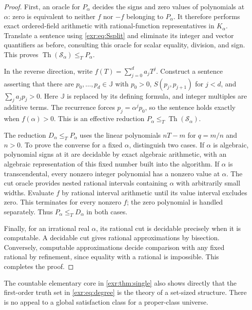 \documentclass[11pt,letterpaper]{article}
\numberwithin{equation}{section}
\theoremstyle{definition}
\theoremstyle{remark}
\newcommand{\J}{\mathbb J}
\newcommand{\Th}{\operatorname{Th}}
\begin{document}
\begin{proof}
First, an oracle for $P_\alpha$ decides the signs and zero values of polynomials
at $\alpha$: zero is equivalent to neither $f$ nor $-f$ belonging to $P_\alpha$.
It therefore performs exact ordered-field arithmetic with rational-function
representatives in $K_\alpha$. Translate a sentence using \eqref{exr:eq:Ssplit} and
eliminate its integer and vector quantifiers as before, consulting this oracle
for scalar equality, division, and sign. This proves
$\Th(\mathcal S_\alpha)\leq_T P_\alpha$.

In the reverse direction, write $f(T)=\sum_{j=0}^{d}a_jT^j$. Construct a sentence
asserting that there are $p_0,\ldots,p_d\in\J$ with $p_0>0$,
$S(p_j,p_{j+1})$ for $j<d$, and $\sum_j a_jp_j>0$. Here $\J$ is replaced by its
defining formula, and integer multiples are additive terms. The recurrence
forces $p_j=\alpha^jp_0$, so the sentence holds exactly when $f(\alpha)>0$.
This is an effective reduction $P_\alpha\leq_T\Th(\mathcal S_\alpha)$.

The reduction $D_\alpha\leq_T P_\alpha$ uses the linear polynomials $nT-m$ for
$q=m/n$ and $n>0$. To prove the converse for a fixed $\alpha$, distinguish two
cases. If $\alpha$ is algebraic, polynomial signs at it are decidable by exact
algebraic arithmetic, with an algebraic representation of this fixed number
built into the algorithm. If $\alpha$ is transcendental, every nonzero integer
polynomial has a nonzero value at $\alpha$. The cut oracle provides nested
rational intervals containing $\alpha$ with arbitrarily small widths. Evaluate
$f$ by rational interval arithmetic until its value interval excludes zero. This
terminates for every nonzero $f$; the zero polynomial is handled separately.
Thus $P_\alpha\leq_T D_\alpha$ in both cases.

Finally, for an irrational real $\alpha$, its rational cut is decidable precisely
when it is computable. A decidable cut gives rational approximations by bisection.
Conversely, computable approximations decide comparison with any fixed rational
by refinement, since equality with a rational is impossible. This completes the
proof.
\end{proof}

The countable elementary core in \cref{exr:thm:single} also shows directly that the
first-order truth set in \eqref{exr:eq:degree} is the theory of a set-sized structure.
There is no appeal to a global satisfaction class for a proper-class universe.
\end{document}
